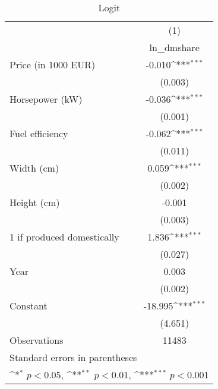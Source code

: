 \begin{table}[htbp]\centering
\def\sym#1{\ifmmode^{#1}\else\(^{#1}\)\fi}
\caption{Logit \label{tab3}}
\begin{tabular}{l*{1}{c}}
\hline\hline
                    &\multicolumn{1}{c}{(1)}\\
                    &\multicolumn{1}{c}{ln\_dmshare}\\
\hline
Price (in 1000 EUR) &      -0.010\sym{***}\\
                    &     (0.003)         \\
[1em]
Horsepower (kW)     &      -0.036\sym{***}\\
                    &     (0.001)         \\
[1em]
Fuel efficiency     &      -0.062\sym{***}\\
                    &     (0.011)         \\
[1em]
Width (cm)          &       0.059\sym{***}\\
                    &     (0.002)         \\
[1em]
Height (cm)         &      -0.001         \\
                    &     (0.003)         \\
[1em]
1 if produced domestically&       1.836\sym{***}\\
                    &     (0.027)         \\
[1em]
Year                &       0.003         \\
                    &     (0.002)         \\
[1em]
Constant            &     -18.995\sym{***}\\
                    &     (4.651)         \\
\hline
Observations        &       11483         \\
\hline\hline
\multicolumn{2}{l}{\footnotesize Standard errors in parentheses}\\
\multicolumn{2}{l}{\footnotesize \sym{*} \(p<0.05\), \sym{**} \(p<0.01\), \sym{***} \(p<0.001\)}\\
\end{tabular}
\end{table}
